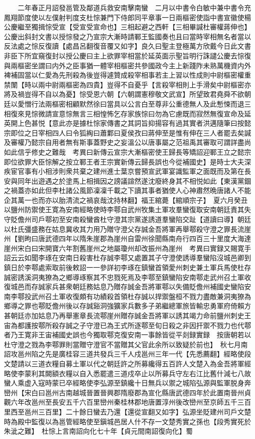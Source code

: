 　　二年春正月詔發邕管及鄰道兵救安南擊南蠻　二月以中書令白敏中兼中書令充鳳翔節度使以左僕射判度支杜悰兼門下侍郎同平章事一日兩樞密使詣中書宣徽使楊公慶繼至獨揖悰受宣【受宣受宣命也】三相起避之西軒【三相畢諴杜審權蔣伸也】公慶出斜封文書以授悰發之乃宣宗大漸時請鄆王監國奏也且曰當時宰相無名者當以反法處之悰反復讀【處昌呂翻復音覆又如字】良久曰聖主登極萬方欣戴今日此文書非臣下所宜窺復封以授公慶曰主上欲罪宰相當於延英面示聖旨明行誅譴公慶去悰復與兩樞密坐謂曰内外之臣事猶一體宰相樞密共參國政今主上新踐阼未熟萬機資内外裨補固當以仁愛為先刑殺為後豈得遽贊成殺宰相事若主上習以性成則中尉樞密權重禁闈【時以兩中尉兩樞密為四貴】豈得不自憂乎【言殺宰相則上手滑矣中尉樞密亦將及禍豈得不自以為憂】悰受恩六朝【六朝謂憲穆敬文武宣】所望致君堯舜不欲朝廷以愛憎行法兩樞密相顧默然徐曰當具以公言白至尊非公重德無人及此慙悚而退三相復來見悰微請宣意悰無言三相惶怖乞存家族悰曰勿為它慮既而寂然無復宣命及延英開上色甚悦【意此亦是據杜悰家傳書之其詞旨抑揚容有過其實者洪邁隨筆曰按懿宗即位之日宰相四人曰令狐綯曰蕭鄴曰夏侯孜曰蔣伸至是惟有伸在三人者罷去矣諴及審權乃懿宗自用者無有斯事蓋野史之妄溫公以唐事屬之范祖禹其審取可謂詳盡尚如此信乎修史之難哉　考異曰新傳云宣宗大漸樞密使王歸長等矯詔迎鄆王立之懿宗即位欲罪大臣悰解之按立鄆王者王宗實新傳云歸長誤也今從補國史】是時士大夫深疾宦官事有小相涉則衆共棄之建州進士葉京嘗預宣武軍宴識監軍之面既而及第在長安與同年出遊遇之於塗馬上相揖因之謗議諠然遂沈廢終身其不相悦如此【東漢黨錮之禍蓋亦如此但李杜諸公風節凜凜千載之下讀其事者猶使人心神肅然晩唐諸人不能企其萬一也而亦以胎清流之禍哀哉沈持林翻】福王綰薨【綰順宗子】　夏六月癸丑以鹽州防禦使王寛為安南經略使時李鄠自武州牧集土軍攻羣蠻復取安南朝廷責其失守貶儋州司戶鄠初至安南殺蠻酋杜守澄其宗黨遂誘道羣蠻陷交趾【道讀曰導】朝廷以杜氏彊盛務在姑息冀收其力用乃贈守澄父存誠金吾將軍再舉鄠殺守澄之罪長流崖州【劉昫曰唐武德四年以隋朱崖郡為崖州自雷州徐聞縣南舟行四百三十里度大海達崖州宋白曰宋開寶六年割舊崖州之地屬瓊州却改振州為崖州　考異曰實録又賜寛手詔云云如聞李琢在安南日殺害杜存誠李鄠又處置其子守澄使誘導羣蠻陷沒城邑卿到鎮日於李鄠處索取前後敕詔一一參詳初李琢在鎮蠻首領愛州刺史兼土軍兵馬使杜存誠密誘溪洞夷獠為之鄉導琢察其不忠戮死焉及李鄠至鎮蠻陷安南鄠走武州召土軍收復城邑而存誠家兵甚衆朝廷務姑息乃贈存誠金吾將軍鄠以失備貶儋州補國史蠻陷安南李鄠投武州召土軍收復頗有功績殺首領杜存誠以捍禦盤桓不戮力盡敵兼洞夷獠為鄉導之罪也鄠貶儋州後以存誠谿洞強獷家兵數多子弟繼總軍旅皆輸忠勇軍府倚賴方甚朝廷亦加姑息乃再舉憲章長流鄠崖州贈存誠金吾將軍以誘其竭力命前鹽州刺史王宙為都護按鄠所殺存誠之子守澄已為王式所逐鄠至旬日殺之非因扞禦不戮力也代鄠者乃王寛非王宙補國史誤也今獨取鄠克復安南一事餘皆從平剡録實録　按唐朝若以杜守澄之戮為李鄠罪則當贈守澄官不當贈其父官此余所以致疑於前也】　秋七月南詔攻邕州陷之先是廣桂容三道共發兵三千人戍邕州三年一代【先悉薦翻】經略使段文楚請以三道衣糧自募土軍以代之朝廷許之所募纔得五百許人文楚入為金吾將軍經略使李蒙利其闕額衣糧以自入悉罷遣三道戍卒止以所募兵守左右江比舊什減七八故蠻人乘虚入寇時蒙已卒經略使李弘源至鎮纔十日無兵以禦之城陷弘源與監軍脱身奔巒州【宋白曰邕州古南越城晉置晉興郡隋廢郡為宣化縣唐武德四年於此置南晉州貞觀六年改邕州至長安五千六百里巒州秦桂林郡地唐置淳州後改巒州至京師五千三百里西至邕州三百里】二十餘日蠻去乃還【還從宣翻又如字】弘源坐貶建州司戶文楚時為殿中監復以為邕管經略使至鎭城邑居人什不存一文楚秀實之孫也【段秀實死於朱泚之難】　杜悰上言南詔向化七十年【貞元間南詔復向化】蜀